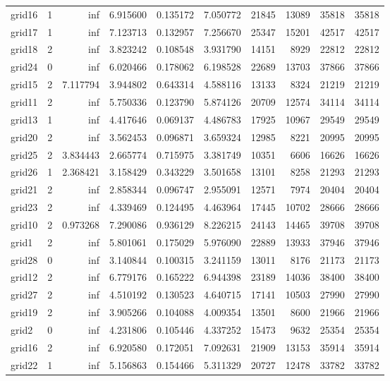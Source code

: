 \begin{longtable}{|l|r|r|r|r|r|r|r|r|r|}
grid16 & 1 & inf & 6.915600 & 0.135172 & 7.050772 & 21845 & 13089 & 35818 & 35818 \\
grid17 & 1 & inf & 7.123713 & 0.132957 & 7.256670 & 25347 & 15201 & 42517 & 42517 \\
grid18 & 2 & inf & 3.823242 & 0.108548 & 3.931790 & 14151 & 8929 & 22812 & 22812 \\
grid24 & 0 & inf & 6.020466 & 0.178062 & 6.198528 & 22689 & 13703 & 37866 & 37866 \\
grid15 & 2 & 7.117794 & 3.944802 & 0.643314 & 4.588116 & 13133 & 8324 & 21219 & 21219 \\
grid11 & 2 & inf & 5.750336 & 0.123790 & 5.874126 & 20709 & 12574 & 34114 & 34114 \\
grid13 & 1 & inf & 4.417646 & 0.069137 & 4.486783 & 17925 & 10967 & 29549 & 29549 \\
grid20 & 2 & inf & 3.562453 & 0.096871 & 3.659324 & 12985 & 8221 & 20995 & 20995 \\
grid25 & 2 & 3.834443 & 2.665774 & 0.715975 & 3.381749 & 10351 & 6606 & 16626 & 16626 \\
grid26 & 1 & 2.368421 & 3.158429 & 0.343229 & 3.501658 & 13101 & 8258 & 21293 & 21293 \\
grid21 & 2 & inf & 2.858344 & 0.096747 & 2.955091 & 12571 & 7974 & 20404 & 20404 \\
grid23 & 2 & inf & 4.339469 & 0.124495 & 4.463964 & 17445 & 10702 & 28666 & 28666 \\
grid10 & 2 & 0.973268 & 7.290086 & 0.936129 & 8.226215 & 24143 & 14465 & 39708 & 39708 \\
grid1 & 2 & inf & 5.801061 & 0.175029 & 5.976090 & 22889 & 13933 & 37946 & 37946 \\
grid28 & 0 & inf & 3.140844 & 0.100315 & 3.241159 & 13011 & 8176 & 21173 & 21173 \\
grid12 & 2 & inf & 6.779176 & 0.165222 & 6.944398 & 23189 & 14036 & 38400 & 38400 \\
grid27 & 2 & inf & 4.510192 & 0.130523 & 4.640715 & 17141 & 10503 & 27990 & 27990 \\
grid19 & 2 & inf & 3.905266 & 0.104088 & 4.009354 & 13501 & 8600 & 21966 & 21966 \\
grid2 & 0 & inf & 4.231806 & 0.105446 & 4.337252 & 15473 & 9632 & 25354 & 25354 \\
grid16 & 2 & inf & 6.920580 & 0.172051 & 7.092631 & 21909 & 13153 & 35914 & 35914 \\
grid22 & 1 & inf & 5.156863 & 0.154466 & 5.311329 & 20727 & 12478 & 33782 & 33782 \\

\end{longtable}
